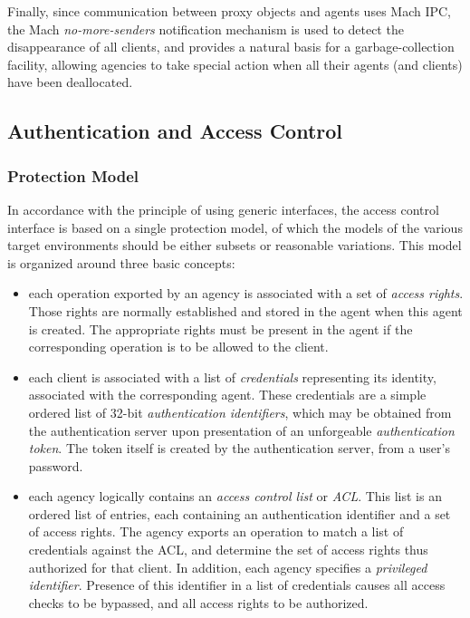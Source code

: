Finally, since communication between proxy objects and agents uses
Mach IPC, the Mach {\em no-more-senders} notification mechanism is
used to detect the disappearance of all clients, and provides a
natural basis for a garbage-collection facility, allowing agencies to
take special action when all their agents (and clients) have been
deallocated.


\subsection{Authentication and Access Control}

\subsubsection{Protection Model}

In accordance with the principle of using generic interfaces, the
access control interface is based on a single protection model, of
which the models of the various target environments should be either
subsets or reasonable variations. This model is organized around three
basic concepts:
\begin{itemize}
\item each operation exported by an agency is associated with a set of
{\em access rights}. Those rights are normally established and stored
in the agent when this agent is created. The appropriate rights must
be present in the agent if the corresponding operation is to be
allowed to the client.

\item each client is associated with a list of {\em credentials}
representing its identity, associated with the corresponding agent.
These credentials are a simple ordered list of 32-bit {\em
authentication identifiers}, which may be obtained from the
authentication server upon presentation of an unforgeable {\em
authentication token}. The token itself is created by the
authentication server, from a user's password.

\item each agency logically contains an {\em access control list} or
{\em ACL}. This list is an ordered list of entries, each containing an
authentication identifier and a set of access rights. The agency
exports an operation to match a list of credentials against the ACL,
and determine the set of access rights thus authorized for that
client. In addition, each agency specifies a {\em privileged
identifier}. Presence of this identifier in a list of credentials
causes all access checks to be bypassed, and all access rights to be
authorized.
\end{itemize}

